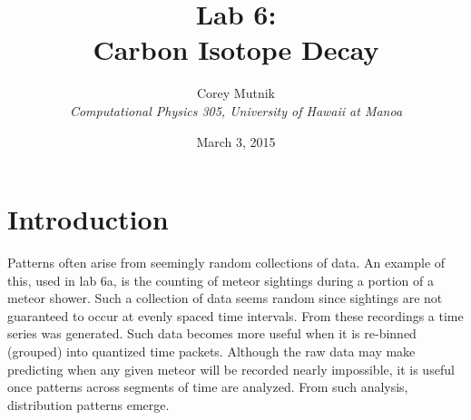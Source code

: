 \documentclass[11pt]{article}
\begin{document}
\pagestyle{myheadings}



\title{Lab 6:\\
Carbon Isotope Decay}


\author{Corey Mutnik \\
{\it Computational Physics 305, University of Hawaii at Manoa} }


\date{March 3, 2015}




\maketitle    %



\section{Introduction}

Patterns often arise from seemingly random collections of data.  An example of this, used in lab 6a, is the 
counting of meteor sightings during a portion of a meteor shower.  Such a collection of data seems random since 
sightings are not guaranteed to occur at evenly spaced time intervals.  From these recordings a time series was 
generated.  Such data becomes more useful when it is re-binned (grouped) into quantized time packets.  Although 
the raw data may make predicting when any given meteor will be recorded nearly impossible, it is useful once 
patterns across segments of time are analyzed.  From such analysis, distribution patterns emerge.
\end{document}
